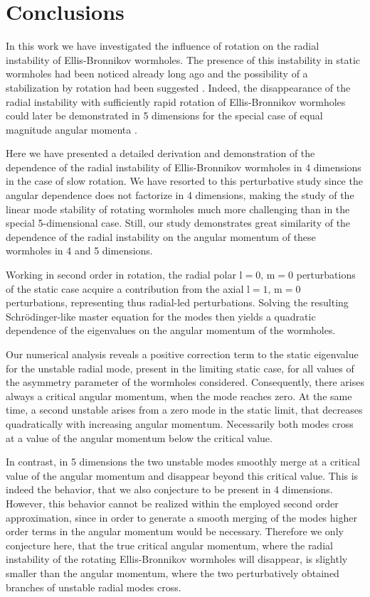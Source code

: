 \documentclass[aps,prd,12pt,superscriptaddress]{revtex4-2}
\begin{document}
\section{Conclusions}

In this work we have investigated the influence of rotation on the radial instability of Ellis-Bronnikov wormholes.
The presence of this instability in static wormholes had been noticed already long ago \cite{Shinkai:2002gv,Gonzalez:2008wd,Gonzalez:2008xk} and the possibility of a stabilization by rotation had been suggested \cite{Matos:2005uh}.
Indeed, the disappearance of the radial instability with sufficiently rapid rotation of Ellis-Bronnikov wormholes could later be demonstrated in 5 dimensions for the special case of equal magnitude angular momenta \cite{Dzhunushaliev:2013jja}.

Here we have presented a detailed derivation and demonstration of the dependence of the radial instability of Ellis-Bronnikov wormholes in 4 dimensions in the case of slow rotation.
We have resorted to this perturbative study since the angular dependence does not factorize in 4 dimensions, making the study of the linear mode stability of rotating wormholes much more challenging than in the special 5-dimensional case.
Still, our study demonstrates great similarity of the dependence of the radial instability on the angular momentum of these wormholes in 4 and 5 dimensions. 

Working in second order in rotation, the radial polar $\mathrm{l}=0,\, \mathrm{m}=0$ perturbations of the static case acquire a contribution from the axial $\mathrm{l}=1,\, \mathrm{m}=0$ perturbations, representing thus radial-led perturbations.
Solving the resulting Schr\"odinger-like master equation for the modes then yields a quadratic dependence of the eigenvalues on the angular momentum of the wormholes.

Our numerical analysis reveals a positive correction term to the static eigenvalue for the unstable radial mode, present in the limiting static case, for all values of the asymmetry parameter of the wormholes considered.
Consequently, there arises always a critical angular momentum, when the mode reaches zero.
At the same time, a second unstable arises from a zero mode in the static limit, that decreases quadratically with increasing angular momentum.
Necessarily both modes cross at a value of the angular momentum below the critical value.

In  contrast, in 5 dimensions the two unstable modes smoothly merge at a critical value of the angular momentum and disappear beyond this critical value.
This is indeed the behavior, that we also conjecture to be present in 4 dimensions.
However, this behavior cannot be realized within the employed second order approximation, since in order to generate a smooth merging of the modes higher order terms in the angular momentum would be necessary.
Therefore we only conjecture here, that the true critical angular momentum, where the radial instability of the rotating Ellis-Bronnikov wormholes will disappear, is slightly smaller than the angular momentum, where the two perturbatively obtained branches of unstable radial modes cross.
\end{document}
